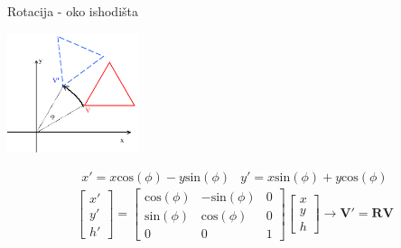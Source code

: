 \documentclass[9pt]{beamer}
\begin{document}
\begin{frame}{Rotacija - oko ishodišta}
	\begin{center}
		\includegraphics[height=3.5cm]{slike/2drotacija.png}
	\end{center}
	$$ \begin{array}{cc} x' = x \text{cos}(\phi)-y\text{sin}(\phi)  & 
	y' = x \text{sin}(\phi)+y\text{cos}(\phi) \end{array}$$
	$$ \left[ \begin{array}{c} x' \\ y' \\ h'  \end{array} \right] = 
	\left[ \begin{array}{ccc}
	\text{cos}(\phi) & -\text{sin}(\phi) & 0 \\
	\text{sin}(\phi) & \text{cos}(\phi) & 0 \\
	0 & 0 & 1 
	\end{array} \right]\left[ \begin{array}{c} x \\ y \\ h \end{array} \right] 
	\rightarrow \mathbf{V'} =  \mathbf{R}\mathbf{V} $$
	
\end{frame}
\end{document}
